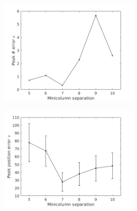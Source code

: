 \documentclass[a4paper,11pt]{article}
\begin{document}
\begin{figure}[!ht]
 \caption{ Error results for 100 random trials. (Left) The peak number error $\kappa$ shows that more strongly connected minicolumn ensembles more accurately encode each firing rate peak as a single spike. (Right) The peak 
            position error $\pi$ is plotted with errorbars of one standard deviation. Minicolumn ensembles with inter-column spacing 7 most accurately represented the firing rate peak timing. }
 \label{fig:encoding_results}
 \centering
    \begin{subfigure}[b]{0.45\textwidth}
      \centering
      \includegraphics[height=2in]{fig/EncodingError_NumPeaks_100trials}
    \end{subfigure}
    \begin{subfigure}[b]{0.45\textwidth}
      \centering
      \includegraphics[height=2in]{fig/EncodingError_PeakPosition_100trials}
    \end{subfigure}
\end{figure}
\end{document}
